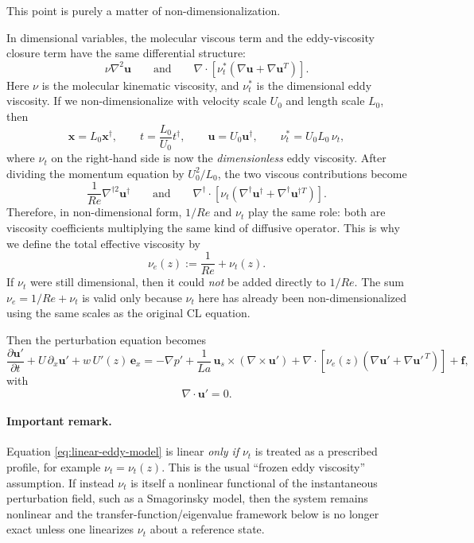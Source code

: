 \documentclass[11pt]{article}
\begin{document}
This point is purely a matter of non-dimensionalization.

In dimensional variables, the molecular viscous term and the eddy-viscosity closure term have the same differential structure:
\begin{equation}
\nu \nabla^2 \bm u
\qquad\text{and}\qquad
\nabla\cdot\left[
\nu_t^*(\nabla \bm u+\nabla \bm u^T)
\right].
\label{eq:dimensional-viscous}
\end{equation}
Here \(\nu\) is the molecular kinematic viscosity, and \(\nu_t^*\) is the dimensional eddy viscosity. If we non-dimensionalize with velocity scale \(U_0\) and length scale \(L_0\), then
\[
\bm x = L_0 \bm x^\dagger,
\qquad
t = \frac{L_0}{U_0} t^\dagger,
\qquad
\bm u = U_0 \bm u^\dagger,
\qquad
\nu_t^* = U_0 L_0 \,\nu_t,
\]
where \(\nu_t\) on the right-hand side is now the \emph{dimensionless} eddy viscosity. After dividing the momentum equation by \(U_0^2/L_0\), the two viscous contributions become
\begin{equation}
\frac{1}{Re}\nabla^{\dagger 2}\bm u^\dagger
\qquad\text{and}\qquad
\nabla^\dagger\cdot\left[
\nu_t(\nabla^\dagger \bm u^\dagger+\nabla^\dagger \bm u^{\dagger T})
\right].
\label{eq:nondim-viscous}
\end{equation}
Therefore, in non-dimensional form, \(1/Re\) and \(\nu_t\) play the same role: both are viscosity coefficients multiplying the same kind of diffusive operator. This is why we define the total effective viscosity by
\begin{equation}
\nu_e(z)
:=
\frac{1}{Re}+\nu_t(z).
\label{eq:nu-effective}
\end{equation}
If \(\nu_t\) were still dimensional, then it could \emph{not} be added directly to \(1/Re\). The sum \(\nu_e=1/Re+\nu_t\) is valid only because \(\nu_t\) here has already been non-dimensionalized using the same scales as the original CL equation.

Then the perturbation equation becomes
\begin{equation}
\frac{\partial \bm u'}{\partial t}
+U\,\partial_x \bm u'
+w\,U'(z)\,\bm e_x
=
-\nabla p'
+\frac{1}{La}\,\bm u_s\times(\nabla\times \bm u')
+\nabla\cdot\left[
\nu_e(z)\left(\nabla \bm u'+\nabla \bm u'^{\,T}\right)
\right]
+\bm f,
\label{eq:linear-eddy-model}
\end{equation}
with
\[
\nabla\cdot \bm u'=0.
\]

\paragraph{Important remark.}
Equation \eqref{eq:linear-eddy-model} is linear \emph{only if} \(\nu_t\) is treated as a prescribed profile, for example \(\nu_t=\nu_t(z)\). This is the usual ``frozen eddy viscosity'' assumption. If instead \(\nu_t\) is itself a nonlinear functional of the instantaneous perturbation field, such as a Smagorinsky model, then the system remains nonlinear and the transfer-function/eigenvalue framework below is no longer exact unless one linearizes \(\nu_t\) about a reference state.
\end{document}
